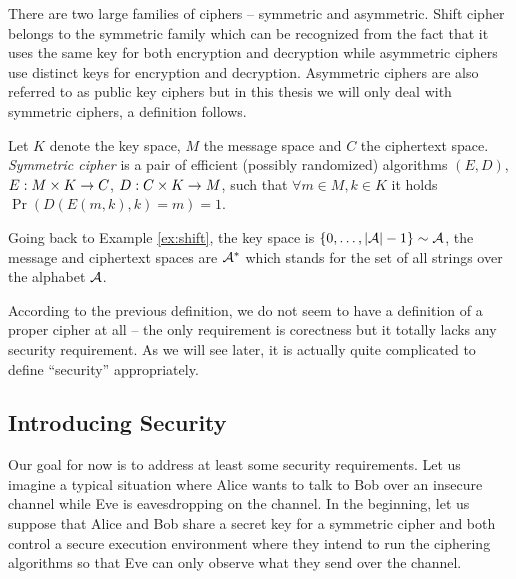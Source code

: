 There are two large families of ciphers -- symmetric and asymmetric. Shift cipher belongs to the symmetric family which can be recognized from the fact that it uses the same key for both encryption and decryption while asymmetric ciphers use distinct keys for encryption and decryption. Asymmetric ciphers are also referred to as public key ciphers but in this thesis we will only deal with symmetric ciphers, a definition follows.

\begin{defn}
	Let $K$ denote the key space, $M$ the message space and $C$ the ciphertext space. {\em Symmetric cipher} is a pair of efficient (possibly randomized) algorithms $(E,D)$, $E:M\times K\rightarrow C$, $D:C\times K\rightarrow M$, such that $\forall m\in M, k\in K$ it holds $\Pr\left(D(E(m,k),k)=m\right) = 1$.   %
\end{defn}

\begin{note}
	Going back to Example \ref{ex:shift}, the key space is $\{0 , \ldots , |{\cal A}|-1\}\sim\cal A$, the message and ciphertext spaces are ${\cal A}^*$ which stands for the set of all strings over the alphabet $\cal A$.
\end{note}

According to the previous definition, we do not seem to have a definition of a proper cipher at all -- the only requirement is corectness but it totally lacks any security requirement. As we will see later, it is actually quite complicated to define ``security'' appropriately.



\subsection{Introducing Security}

Our goal for now is to address at least some security requirements. Let us imagine a typical situation where Alice wants to talk to Bob over an insecure channel while Eve is eavesdropping on the channel. In the beginning, let us suppose that Alice and Bob share a secret key for a symmetric cipher and both control a secure execution environment where they intend to run the ciphering algorithms so that Eve can only observe what they send over the channel.

